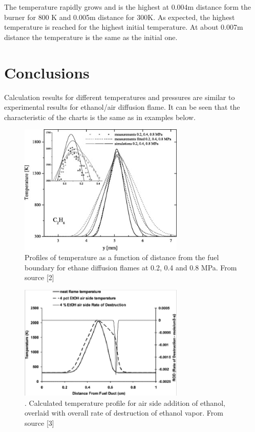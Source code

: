 \documentclass[a4paper]{article}
\newcommand{\sepspace}{\vspace*{1em}}
\begin{document}
\sepspace
The temperature rapidly grows and is the highest at 0.004m  distance form the burner for 800 K and 0.005m distance for 300K. As expected, the highest temperature is reached for the highest initial  temperature. At about 0.007m distance the temperature is the same as the initial one.

\pagebreak


\section{Conclusions}
Calculation results for different temperatures and pressures are similar to experimental results for ethanol/air diffusion flame. It can be seen that the characteristic of the charts is the same as in examples below. 
 


\begin{figure} [h]
\centering
\includegraphics[width=0.7\textwidth]{01.png}
\caption{\label{fig:3}Profiles of temperature as a function of distance from the fuel boundary for ethane diffusion flames at 0.2, 0.4 and 0.8 MPa. From source [2]}
\end{figure}



\begin{figure} [h]
\centering
\includegraphics[width=0.7\textwidth]{02.png}
\caption{\label{fig:4}. Calculated temperature profile for air side addition of ethanol, overlaid with overall rate of destruction of ethanol vapor. From source [3]}
\end{figure}
\end{document}
